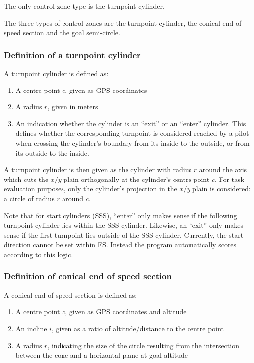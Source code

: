 \documentclass{article}
\begin{document}
The only control zone type is the turnpoint cylinder.

The three types of control zones are the turnpoint cylinder, the conical end of
speed section and the goal semi-circle.

\subsubsection{Definition of a turnpoint cylinder}
A turnpoint cylinder is defined as:
\begin{enumerate}
    \item A centre point \(c\), given as GPS coordinates
    \item A radius \(r\), given in meters
    \item
        An indication whether the cylinder is an “exit” or an “enter” cylinder.
        This defines whether the corresponding turnpoint is considered reached
        by a pilot when crossing the cylinder’s boundary from its inside to the
        outside, or from its outside to the inside.
\end{enumerate}

A turnpoint cylinder is then given as the cylinder with radius \(r\) around the
axis which cuts the \(x/y\) plain orthogonally at the cylinder’s centre point
\(c\).  For task evaluation purposes, only the cylinder’s projection in the
\(x/y\) plain is considered: a circle of radius \(r\) around \(c\).

Note that for start cylinders (SSS), “enter” only makes sense if the following
turnpoint cylinder lies within the SSS cylinder. Likewise, an “exit” only makes
sense if the first turnpoint lies outside of the SSS cylinder. Currently, the
start direction cannot be set within FS. Instead the program automatically
scores according to this logic.

\subsubsection{Definition of conical end of speed section}
\label{sec:define-CESS}
A conical end of speed section is defined as:
\begin{enumerate}
    \item A centre point \(c\), given as GPS coordinates and altitude
    \item
        An incline \(i\), given as a ratio of altitude/distance to the centre
        point
    \item
        A radius \(r\), indicating the size of the circle resulting from the
        intersection between the cone and a horizontal plane at goal altitude
\end{enumerate}
\end{document}
